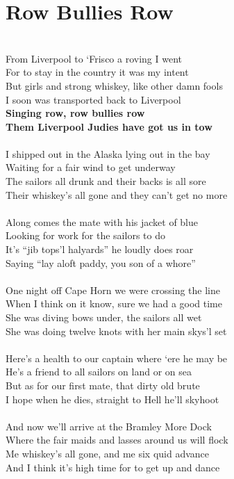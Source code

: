 \documentclass[letterpaper,9pt]{article}
\begin{document}
\section{Row Bullies Row}
\noindent
\\From Liverpool to ‘Frisco a roving I went
\\For to stay in the country it was my intent
\\But girls and strong whiskey, like other damn fools
\\I soon was transported back to Liverpool 
\\\textbf{Singing row, row bullies row
\\Them Liverpool Judies have got us in tow}
\\
\\I shipped out in the Alaska lying out in the bay
\\Waiting for a fair wind to get underway
\\The sailors all drunk and their backs is all sore
\\Their whiskey’s all gone and they can’t get no more
\\
\\Along comes the mate with his jacket of blue
\\Looking for work for the sailors to do
\\It’s “jib tops’l halyards” he loudly does roar
\\Saying “lay aloft paddy, you son of a whore”
\\
\\One night off Cape Horn we were crossing the line
\\When I think on it know, sure we had a good time
\\She was diving bows under, the sailors all wet
\\She was doing twelve knots with her main skys’l set
\\
\\Here’s a health to our captain where ‘ere he may be
\\He’s a friend to all sailors on land or on sea
\\But as for our first mate, that dirty old brute
\\I hope when he dies, straight to Hell he’ll skyhoot
\\
\\And now we’ll arrive at the Bramley More Dock
\\Where the fair maids and lasses around us will flock
\\Me whiskey’s all gone, and me six quid advance
\\And I think it’s high time for to get up and dance
\end{document}
